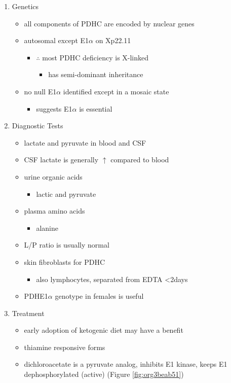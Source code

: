 \documentclass{scrartcl}
\begin{document}
\begin{enumerate}
\item Genetics
\label{sec:orge0463c7}
\begin{itemize}
\item all components of PDHC are encoded by nuclear genes
\item autosomal except E1\(\alpha\) on Xp22.11
\begin{itemize}
\item \(\therefore\) most PDHC deficiency is X-linked
\begin{itemize}
\item has semi-dominant inheritance
\end{itemize}
\end{itemize}
\item no null E1\(\alpha\) identified except in a mosaic state
\begin{itemize}
\item suggests E1\(\alpha\) is essential
\end{itemize}
\end{itemize}

\item Diagnostic Tests
\label{sec:org5275517}
\begin{itemize}
\item lactate and pyruvate in blood and CSF
\item CSF lactate is generally \(\uparrow\) compared to blood
\item urine organic acids
\begin{itemize}
\item lactic and pyruvate
\end{itemize}
\item plasma amino acids
\begin{itemize}
\item alanine
\end{itemize}
\item L/P ratio is usually normal
\item skin fibroblasts for PDHC
\begin{itemize}
\item also lymphocytes, separated from EDTA <2days
\end{itemize}
\item PDHE1\(\alpha\) genotype in females is useful
\end{itemize}

\item Treatment
\label{sec:orgffc468f}
\begin{itemize}
\item early adoption of ketogenic diet may have a benefit
\item thiamine responsive forms
\item dichloroacetate is a pyruvate analog, inhibits E1 kinase, keeps E1
dephosphorylated (active) (Figure \ref{fig:org3beab51})
\end{itemize}


\end{enumerate}
\end{document}
